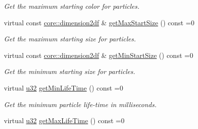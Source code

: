 \begin{DoxyCompactItemize}
\begin{DoxyCompactList}\small\item\em Get the maximum starting color for particles. \end{DoxyCompactList}\item 
\mbox{\label{classirr_1_1scene_1_1IParticleEmitter_a89a84536dc2ddc0df4ec831f9367b187}} 
virtual const \hyperlink{namespaceirr_1_1core_af6dc5c45ff13e7712758c827ff58676b}{core\+::dimension2df} \& \hyperlink{classirr_1_1scene_1_1IParticleEmitter_a89a84536dc2ddc0df4ec831f9367b187}{get\+Max\+Start\+Size} () const =0
\begin{DoxyCompactList}\small\item\em Get the maximum starting size for particles. \end{DoxyCompactList}\item 
\mbox{\label{classirr_1_1scene_1_1IParticleEmitter_a97ddc124d93f83164aa49f7b6370bc8f}} 
virtual const \hyperlink{namespaceirr_1_1core_af6dc5c45ff13e7712758c827ff58676b}{core\+::dimension2df} \& \hyperlink{classirr_1_1scene_1_1IParticleEmitter_a97ddc124d93f83164aa49f7b6370bc8f}{get\+Min\+Start\+Size} () const =0
\begin{DoxyCompactList}\small\item\em Get the minimum starting size for particles. \end{DoxyCompactList}\item 
\mbox{\label{classirr_1_1scene_1_1IParticleEmitter_a35c512bd4cd12411ae0b7344f7511dd0}} 
virtual \hyperlink{namespaceirr_a0416a53257075833e7002efd0a18e804}{u32} \hyperlink{classirr_1_1scene_1_1IParticleEmitter_a35c512bd4cd12411ae0b7344f7511dd0}{get\+Min\+Life\+Time} () const =0
\begin{DoxyCompactList}\small\item\em Get the minimum particle life-\/time in milliseconds. \end{DoxyCompactList}\item 
\mbox{\label{classirr_1_1scene_1_1IParticleEmitter_a8e0455166f97db683686b5deb43da83f}} 
virtual \hyperlink{namespaceirr_a0416a53257075833e7002efd0a18e804}{u32} \hyperlink{classirr_1_1scene_1_1IParticleEmitter_a8e0455166f97db683686b5deb43da83f}{get\+Max\+Life\+Time} () const =0

\end{DoxyCompactItemize}
